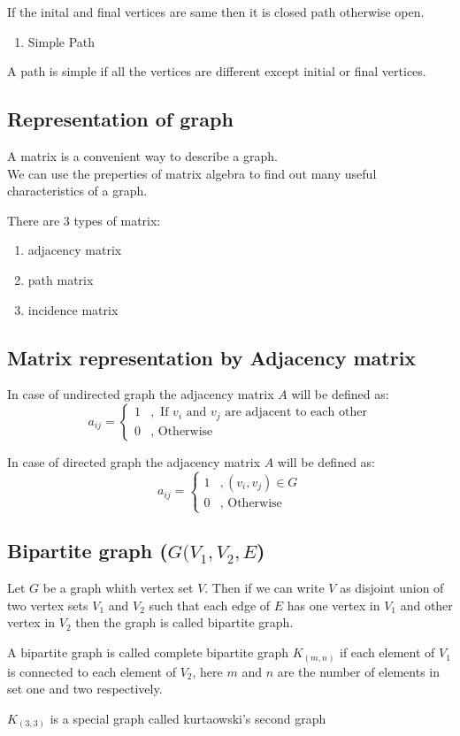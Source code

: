 \documentclass[11pt,letterpaper]{article}
\begin{document}
If the inital and final vertices are same then it is closed path otherwise open.\\

\begin{enumerate}
  \item Simple Path
\end{enumerate}

A path is simple if all the vertices are different except initial or final vertices.

\subsection{Representation of graph}
A matrix is a convenient way to describe a graph. \\
We can use the preperties of matrix algebra to find out many useful characteristics of a graph.

There are 3 types of matrix:
\begin{enumerate}
  \item adjacency matrix 
  \item path matrix
  \item incidence matrix
\end{enumerate}

\subsection{Matrix representation by Adjacency matrix}
In case of undirected graph the adjacency matrix $A$ will be defined as:
\[
  a_{ij} = \begin{cases}
    1 &, \text{ If $v_i$ and $v_j$ are adjacent to each other}\\
    0 &, \text{ Otherwise}
  \end{cases}
\]

In case of directed graph the adjacency matrix $A$ will be defined as:
\[
  a_{ij} = \begin{cases}
    1 &, (v_i,v_j) \in G\\
    0 &, \text{ Otherwise}
  \end{cases}
\]

\subsection{Bipartite graph ($G(V_1,V_2,E$)}
Let $G$ be a graph whith vertex set $V$. Then if we can write $V$ as disjoint union of two vertex sets $V_1$ and $V_2$ such that each edge of $E$ has one vertex in $V_1$ and other vertex in $V_2$ then the graph is called bipartite graph.

A bipartite graph is called complete bipartite graph $K_(m,n)$ if each element of $V_1$ is connected to each element of $V_2$, here $m$ and $n$ are the number of elements in set one and two respectively.

$K_(3,3)$ is a special graph called kurtaowski's second graph
\end{document}
